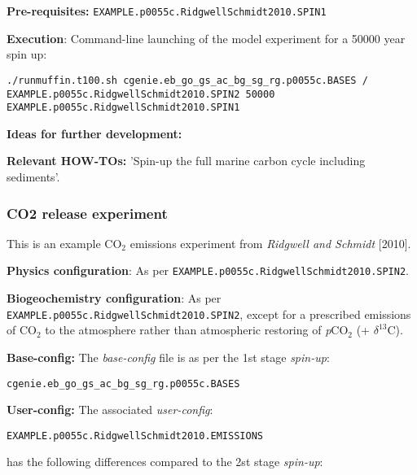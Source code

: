 \documentclass[10pt,twoside]{article}
\begin{document}
\noindent \textbf{Pre-requisites:} \texttt{EXAMPLE.p0055c.RidgwellSchmidt2010.SPIN1}

\noindent \textbf{Execution}: Command-line launching of the model experiment for a 50000 year spin up:
\vspace{-10pt}\small\begin{verbatim}
./runmuffin.t100.sh cgenie.eb_go_gs_ac_bg_sg_rg.p0055c.BASES / 
EXAMPLE.p0055c.RidgwellSchmidt2010.SPIN2 50000 
EXAMPLE.p0055c.RidgwellSchmidt2010.SPIN1
\end{verbatim}\normalsize\vspace{-10pt}

\noindent \textbf{Ideas for further development:} 

\noindent \textbf{Relevant HOW-TOs:} 'Spin-up the full marine carbon cycle including sediments'.


\subsubsection{CO2 release experiment}\label{EXAMPLE.p0055c.RidgwellSchmidt2010.EMISSIONS}

This is an example CO$_{2}$ emissions experiment from \textit{Ridgwell and Schmidt} [2010].

\noindent \textbf{Physics configuration}: As per \texttt{EXAMPLE.p0055c.RidgwellSchmidt2010.SPIN2}.

\noindent \textbf{Biogeochemistry configuration}: As per \texttt{EXAMPLE.p0055c.RidgwellSchmidt2010.SPIN2}, except for a prescribed emissions of CO$_{2}$ to the atmosphere rather than atmospheric restoring of \textit{p}CO$_{2}$ (+ $\delta^{13}$C).

\noindent \textbf{Base-config:} The \textit{base-config} file is as per the 1st stage \textit{spin-up}:
\vspace{-10pt}\begin{verbatim}cgenie.eb_go_gs_ac_bg_sg_rg.p0055c.BASES\end{verbatim}\vspace{-10pt}

\noindent \textbf{User-config:} The associated \textit{user-config}:
\vspace{-10pt}\begin{verbatim}EXAMPLE.p0055c.RidgwellSchmidt2010.EMISSIONS\end{verbatim}\vspace{-10pt}
has the following differences compared to the 2st stage \textit{spin-up}:
\end{document}
